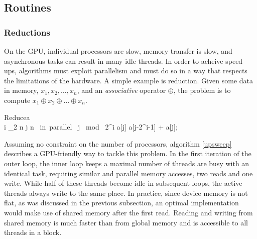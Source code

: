 \subsection{Routines}
\label{sec:routines}
\subsubsection{Reductions}
\label{subsec:reduce}
On the GPU, individual processors are slow, memory transfer is slow, and asynchronous tasks can result in many idle threads. In order to acheive speed-ups, algorithms must exploit parallelism and must do so in a way that respects the limitations of the hardware. A simple example is reduction. Given some data in memory, $x_1, x_2, \ldots, x_n$, and an \textit{associative} operator $\oplus$, the problem is to compute $x_1 \oplus x_2 \oplus \ldots \oplus x_n$. 

\begin{pseudocode}[ruled]{Reduce}{a}
\label{upsweep}
\\
\FOR i  \TO \log_2 n \DO \BEGIN
  \FOR j  \TO n \mbox{ in parallel }\DO \BEGIN
    \IF j \mbox{ mod } 2^i \DO \BEGIN
    a[j] \GETS a[j-2^{i-1}] + a[j];\\
    \END \END \END
{}
\end{pseudocode}

Assuming no constraint on the number of processors, algorithm \ref{upsweep} describes a GPU-friendly way to tackle this problem. In the first iteration of the outer loop, the inner loop keeps a maximal number of threads are busy with an identical task, requiring similar and parallel memory accesses, two reads and one write. While half of these threads become idle in subsequent loops, the active threads always write to the same place. In practice, since device memory is not flat, as was discussed in the previous subsection, an optimal implementation would make use of shared memory after the first read. Reading and writing from shared memory is much faster than from global memory and is accessible to all threads in a block.



